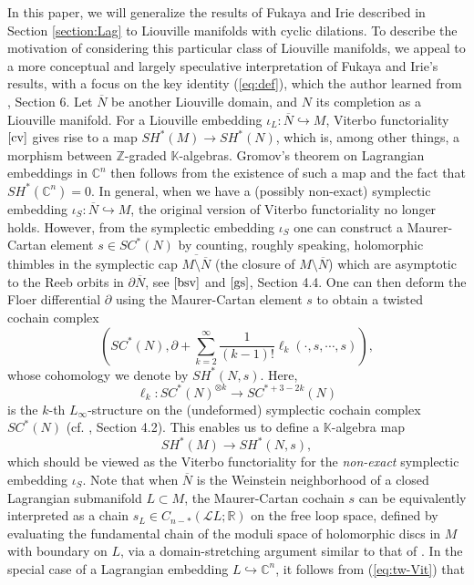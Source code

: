 \documentclass[a4paper]{article}
\numberwithin{equation}{section}
\begin{document}
In this paper, we will generalize the results of Fukaya and Irie described in Section \ref{section:Lag} to Liouville manifolds with cyclic dilations. To describe the motivation of considering this particular class of Liouville manifolds, we appeal to a more conceptual and largely speculative interpretation of Fukaya and Irie's results, with a focus on the key identity (\ref{eq:def}), which the author learned from \cite{jlf}, Section 6. Let $\overline{N}$ be another Liouville domain, and $N$ its completion as a Liouville manifold. For a Liouville embedding $\iota_L:\overline{N}\hookrightarrow M$, Viterbo functoriality $\cite{cv}$ gives rise to a map $\mathit{SH}^\ast(M)\rightarrow\mathit{SH}^\ast(N)$, which is, among other things, a morphism between $\mathbb{Z}$-graded $\mathbb{K}$-algebras. Gromov's theorem on Lagrangian embeddings in $\mathbb{C}^n$ then follows from the existence of such a map and the fact that $\mathit{SH}^\ast(\mathbb{C}^n)=0$. In general, when we have a (possibly non-exact) symplectic embedding $\iota_S:\overline{N}\hookrightarrow M$, the original version of Viterbo functoriality no longer holds. However, from the symplectic embedding $\iota_S$ one can construct a Maurer-Cartan element $s\in\mathit{SC}^\ast(N)$ by counting, roughly speaking, holomorphic thimbles in the symplectic cap $\overline{M\setminus\overline{N}}$ (the closure of $M\setminus\overline{N}$) which are asymptotic to the Reeb orbits in $\partial\overline{N}$, see $\cite{bsv}$ and $\cite{gs}$, Section 4.4. One can then deform the Floer differential $\partial$ using the Maurer-Cartan element $s$ to obtain a twisted cochain complex
\begin{equation}
\left(\mathit{SC}^\ast(N),\partial+\sum_{k=2}^\infty\frac{1}{(k-1)!}\ell_k(\cdot,s,\cdots,s)\right),
\end{equation}
whose cohomology we denote by $\mathit{SH}^\ast(N,s)$. Here,
\begin{equation}
\ell_k:\mathit{SC}^\ast(N)^{\otimes k}\rightarrow\mathit{SC}^{\ast+3-2k}(N)
\end{equation}
is the $k$-th $L_\infty$-structure on the (undeformed) symplectic cochain complex $\mathit{SC}^\ast(N)$ (cf. \cite{dt}, Section 4.2). This enables us to define a $\mathbb{K}$-algebra map
\begin{equation}\label{eq:tw-Vit}
\mathit{SH}^\ast(M)\rightarrow\mathit{SH}^\ast(N,s),
\end{equation}
which should be viewed as the Viterbo functoriality for the \textit{non-exact} symplectic embedding $\iota_S$. Note that when $\overline{N}$ is the Weinstein neighborhood of a closed Lagrangian submanifold $L\subset M$, the Maurer-Cartan cochain $s$ can be equivalently interpreted as a chain $s_L\in C_{n-\ast}(\mathcal{L}L;\mathbb{R})$ on the free loop space, defined by evaluating the fundamental chain of the moduli space of holomorphic discs in $M$ with boundary on $L$, via a domain-stretching argument similar to that of \cite{dt}. In the special case of a Lagrangian embedding $L\hookrightarrow\mathbb{C}^n$, it follows from (\ref{eq:tw-Vit}) that
\end{document}
